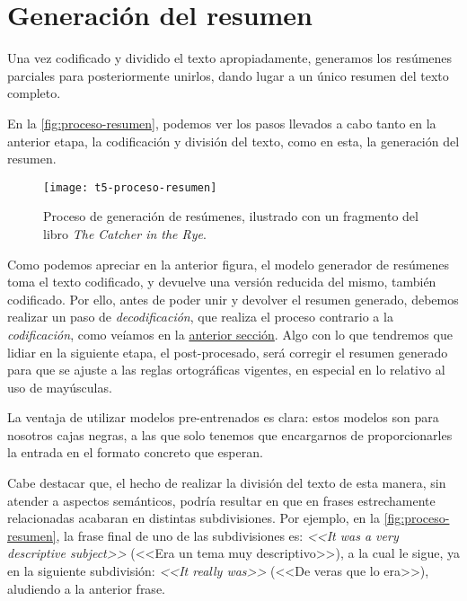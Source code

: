 \newpage

\section{Generación del resumen} \label{sec:resumen}

Una vez codificado y dividido el texto apropiadamente, generamos los resúmenes parciales para posteriormente unirlos, dando lugar a un único resumen del texto completo.

En la \autoref{fig:proceso-resumen}, podemos ver los pasos llevados a cabo tanto en la anterior etapa, la codificación y división del texto, como en esta, la generación del resumen.

\begin{figure}[h]
	\centering
	\texttt{[image: t5-proceso-resumen]}
	\caption[Proceso de generación de resúmenes.]{Proceso de generación de resúmenes, ilustrado con un fragmento del libro \emph{The Catcher in the Rye}.}
	\label{fig:proceso-resumen}	
\end{figure}

Como podemos apreciar en la anterior figura, el modelo generador de resúmenes toma el texto codificado, y devuelve una versión reducida del mismo, también codificado. Por ello, antes de poder unir y devolver el resumen generado, debemos realizar un paso de \emph{decodificación}, que realiza el proceso contrario a la \emph{codificación}, como veíamos en la \hyperref[sec:codificacion]{anterior sección}. Algo con lo que tendremos que lidiar en la siguiente etapa, el post-procesado, será corregir el resumen generado para que se ajuste a las reglas ortográficas vigentes, en especial en lo relativo al uso de mayúsculas.

La ventaja de utilizar modelos pre-entrenados es clara: estos modelos son para nosotros cajas negras, a las que solo tenemos que encargarnos de proporcionarles la entrada en el formato concreto que esperan.

Cabe destacar que, el hecho de realizar la división del texto de esta manera, sin atender a aspectos semánticos, podría resultar en que en frases estrechamente relacionadas acabaran en distintas subdivisiones. Por ejemplo, en la \autoref{fig:proceso-resumen}, la frase final de uno de las subdivisiones es: \emph{<<It was a very descriptive subject>>} (<<Era un tema muy descriptivo>>), a la cual le sigue, ya en la siguiente subdivisión: \emph{<<It really was>>} (<<De veras que lo era>>), aludiendo a la anterior frase.

